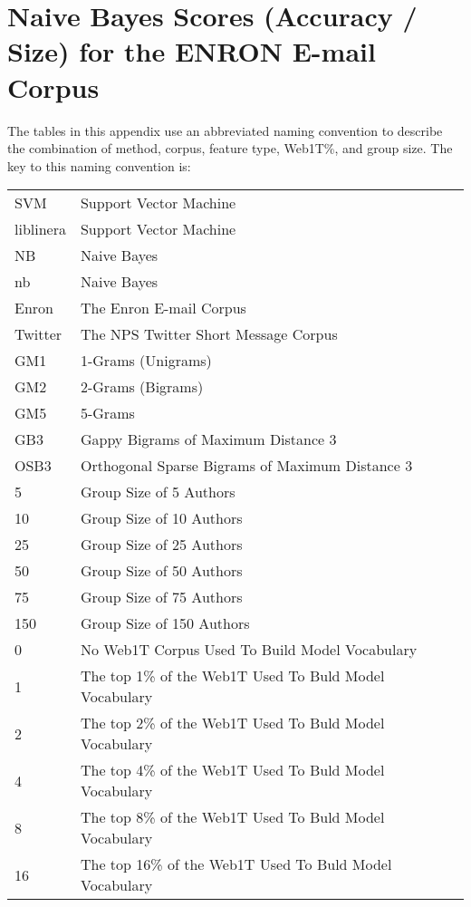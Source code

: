 \chapter{Naive Bayes Scores (Accuracy / Size) for the ENRON E-mail Corpus}

The tables in this appendix use an abbreviated naming convention to describe the combination of method, corpus, feature type, Web1T\%, and group size.  The key to this naming convention is:

\begin{center}
\begin{table}[htbp!]
	\begin{center}
	\begin{tabular}{ll}
	SVM & Support Vector Machine\\
	liblinera & Support Vector Machine\\
	NB & Naive Bayes\\
	nb & Naive Bayes\\
	
	Enron & The Enron E-mail Corpus\\
	Twitter & The NPS Twitter Short Message Corpus\\
	
	GM1 & 1-Grams (Unigrams)\\
	GM2 & 2-Grams (Bigrams)\\
	GM5 & 5-Grams\\
	GB3 & Gappy Bigrams of Maximum Distance 3\\
	OSB3 & Orthogonal Sparse Bigrams of Maximum Distance 3\\
		
	5 & Group Size of 5 Authors\\
	10 & Group Size of 10 Authors\\
	25 & Group Size of 25 Authors\\
	50 & Group Size of 50 Authors\\
	75 & Group Size of 75 Authors\\
	150 & Group Size of 150 Authors\\
	
	0 & No Web1T Corpus Used To Build Model Vocabulary\\
	1 & The top 1\% of the Web1T Used To Buld Model Vocabulary\\
	2 & The top 2\% of the Web1T Used To Buld Model Vocabulary\\
	4 & The top 4\% of the Web1T Used To Buld Model Vocabulary\\
	8 & The top 8\% of the Web1T Used To Buld Model Vocabulary\\
	16 & The top 16\% of the Web1T Used To Buld Model Vocabulary\\
	\end{tabular}
	\end{center}
\end{table}
\end{center}



